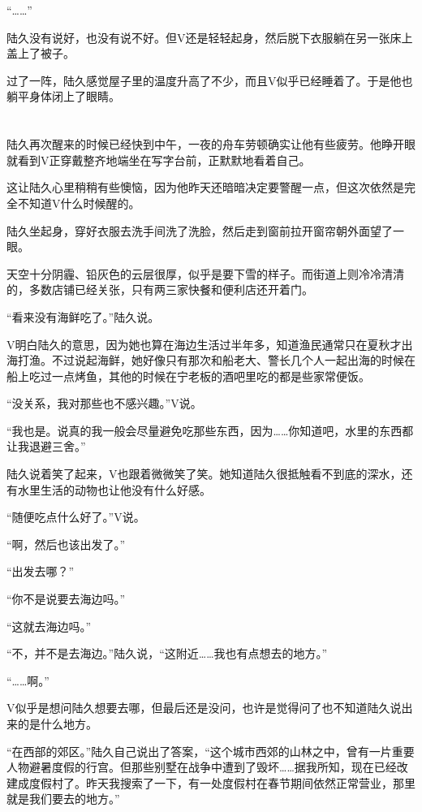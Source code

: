 “……”

陆久没有说好，也没有说不好。但V还是轻轻起身，然后脱下衣服躺在另一张床上盖上了被子。

过了一阵，陆久感觉屋子里的温度升高了不少，而且V似乎已经睡着了。于是他也躺平身体闭上了眼睛。

\section*{}

陆久再次醒来的时候已经快到中午，一夜的舟车劳顿确实让他有些疲劳。他睁开眼就看到V正穿戴整齐地端坐在写字台前，正默默地看着自己。

这让陆久心里稍稍有些懊恼，因为他昨天还暗暗决定要警醒一点，但这次依然是完全不知道V什么时候醒的。

陆久坐起身，穿好衣服去洗手间洗了洗脸，然后走到窗前拉开窗帘朝外面望了一眼。

天空十分阴霾、铅灰色的云层很厚，似乎是要下雪的样子。而街道上则冷冷清清的，多数店铺已经关张，只有两三家快餐和便利店还开着门。

“看来没有海鲜吃了。”陆久说。

V明白陆久的意思，因为她也算在海边生活过半年多，知道渔民通常只在夏秋才出海打渔。不过说起海鲜，她好像只有那次和船老大、警长几个人一起出海的时候在船上吃过一点烤鱼，其他的时候在宁老板的酒吧里吃的都是些家常便饭。

“没关系，我对那些也不感兴趣。”V说。

“我也是。说真的我一般会尽量避免吃那些东西，因为……你知道吧，水里的东西都让我退避三舍。”

陆久说着笑了起来，V也跟着微微笑了笑。她知道陆久很抵触看不到底的深水，还有水里生活的动物也让他没有什么好感。

“随便吃点什么好了。”V说。

“啊，然后也该出发了。”

“出发去哪？”

“你不是说要去海边吗。”

“这就去海边吗。”

“不，并不是去海边。”陆久说，“这附近……我也有点想去的地方。”

“……啊。”

V似乎是想问陆久想要去哪，但最后还是没问，也许是觉得问了也不知道陆久说出来的是什么地方。

“在西部的郊区。”陆久自己说出了答案，“这个城市西郊的山林之中，曾有一片重要人物避暑度假的行宫。但那些别墅在战争中遭到了毁坏……据我所知，现在已经改建成度假村了。昨天我搜索了一下，有一处度假村在春节期间依然正常营业，那里就是我们要去的地方。”

